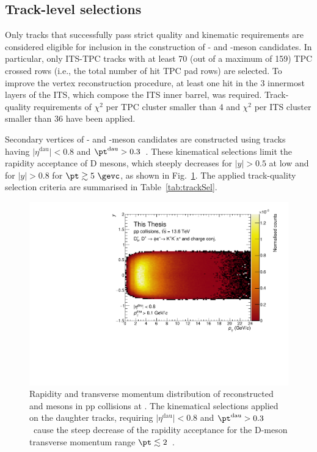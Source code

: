 \subsection{Track-level selections}
Only tracks that successfully pass strict quality and kinematic requirements are considered eligible for inclusion in the construction of \ds- and \dpl-meson candidates. In particular, only ITS-TPC tracks with at least 70 (out of a maximum of 159) TPC crossed rows (i.e., the total number of hit TPC pad rows) are selected. To improve the vertex reconstruction procedure, at least one hit in the 3 innermost layers of the ITS, which compose the ITS inner barrel, was required. Track-quality requirements of $\chi^2$ per TPC cluster smaller than 4 and $\chi^2$ per ITS cluster smaller than 36 have been applied.

Secondary vertices of \ds- and \dpl-meson candidates are constructed using tracks having $\lvert\eta^\mathrm{dau}\rvert < 0.8$ and $\pt^\mathrm{dau} > 0.3$~\gevc. These kinematical selections limit the rapidity acceptance of D mesons, which steeply decreases for $\lvert y\rvert > 0.5$ at low \pt and for $\lvert y\rvert > 0.8$ for $\pt \gtrsim 5~\gevc$, as shown in Fig.~\ref{fig:RapidityAcceptance}. The applied track-quality selection criteria are summarised in Table~\ref{tab:trackSel}. 
\begin{figure}[htb]
    \centering
    \includegraphics[width=0.7\linewidth]{Figures/Chapter 4/PtVsY.pdf}
    \caption{Rapidity and transverse momentum distribution of reconstructed \ds and \dpl mesons in pp collisions at \thirteen. The kinematical selections applied on the daughter tracks, requiring $\lvert\eta^\mathrm{dau}\rvert < 0.8$ and $\pt^\mathrm{dau} > 0.3$~\gevc cause the steep decrease of the rapidity acceptance for the D-meson transverse momentum range $\pt\lesssim2$~\gev.}
    \label{fig:RapidityAcceptance}
\end{figure}

